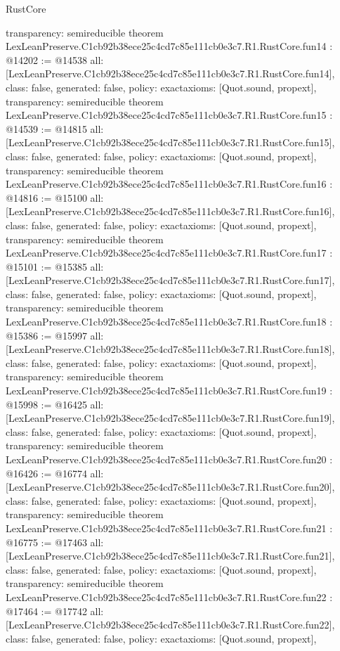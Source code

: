 \begin{lexlean}{RustCore}
\begin{coremodule}
{  transparency: semireducible
}
theorem LexLeanPreserve.C1cb92b38ece25c4cd7c85e111cb0e3c7.R1.RustCore.fun14 : @14202 := @14538 {
  all: [LexLeanPreserve.C1cb92b38ece25c4cd7c85e111cb0e3c7.R1.RustCore.fun14],
  class: false,
  generated: false,
  policy: exact{axioms: [Quot.sound, propext]},
  transparency: semireducible
}
theorem LexLeanPreserve.C1cb92b38ece25c4cd7c85e111cb0e3c7.R1.RustCore.fun15 : @14539 := @14815 {
  all: [LexLeanPreserve.C1cb92b38ece25c4cd7c85e111cb0e3c7.R1.RustCore.fun15],
  class: false,
  generated: false,
  policy: exact{axioms: [Quot.sound, propext]},
  transparency: semireducible
}
theorem LexLeanPreserve.C1cb92b38ece25c4cd7c85e111cb0e3c7.R1.RustCore.fun16 : @14816 := @15100 {
  all: [LexLeanPreserve.C1cb92b38ece25c4cd7c85e111cb0e3c7.R1.RustCore.fun16],
  class: false,
  generated: false,
  policy: exact{axioms: [Quot.sound, propext]},
  transparency: semireducible
}
theorem LexLeanPreserve.C1cb92b38ece25c4cd7c85e111cb0e3c7.R1.RustCore.fun17 : @15101 := @15385 {
  all: [LexLeanPreserve.C1cb92b38ece25c4cd7c85e111cb0e3c7.R1.RustCore.fun17],
  class: false,
  generated: false,
  policy: exact{axioms: [Quot.sound, propext]},
  transparency: semireducible
}
theorem LexLeanPreserve.C1cb92b38ece25c4cd7c85e111cb0e3c7.R1.RustCore.fun18 : @15386 := @15997 {
  all: [LexLeanPreserve.C1cb92b38ece25c4cd7c85e111cb0e3c7.R1.RustCore.fun18],
  class: false,
  generated: false,
  policy: exact{axioms: [Quot.sound, propext]},
  transparency: semireducible
}
theorem LexLeanPreserve.C1cb92b38ece25c4cd7c85e111cb0e3c7.R1.RustCore.fun19 : @15998 := @16425 {
  all: [LexLeanPreserve.C1cb92b38ece25c4cd7c85e111cb0e3c7.R1.RustCore.fun19],
  class: false,
  generated: false,
  policy: exact{axioms: [Quot.sound, propext]},
  transparency: semireducible
}
theorem LexLeanPreserve.C1cb92b38ece25c4cd7c85e111cb0e3c7.R1.RustCore.fun20 : @16426 := @16774 {
  all: [LexLeanPreserve.C1cb92b38ece25c4cd7c85e111cb0e3c7.R1.RustCore.fun20],
  class: false,
  generated: false,
  policy: exact{axioms: [Quot.sound, propext]},
  transparency: semireducible
}
theorem LexLeanPreserve.C1cb92b38ece25c4cd7c85e111cb0e3c7.R1.RustCore.fun21 : @16775 := @17463 {
  all: [LexLeanPreserve.C1cb92b38ece25c4cd7c85e111cb0e3c7.R1.RustCore.fun21],
  class: false,
  generated: false,
  policy: exact{axioms: [Quot.sound, propext]},
  transparency: semireducible
}
theorem LexLeanPreserve.C1cb92b38ece25c4cd7c85e111cb0e3c7.R1.RustCore.fun22 : @17464 := @17742 {
  all: [LexLeanPreserve.C1cb92b38ece25c4cd7c85e111cb0e3c7.R1.RustCore.fun22],
  class: false,
  generated: false,
  policy: exact{axioms: [Quot.sound, propext]},
}
\end{coremodule}
\end{lexlean}
